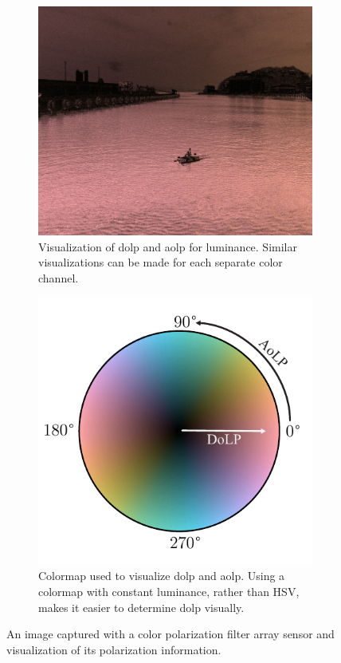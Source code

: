 \begin{figure}[H]\ContinuedFloat
    \begin{subfigure}[B]{.49\textwidth}
        \includegraphics[width=\textwidth]{figures/img_0080_right_pol.jpg}
        \caption{Visualization of \gls{dolp} and \gls{aolp} for luminance. Similar visualizations can be made for each separate color channel.}
    \end{subfigure}
    \hfill
    \begin{subfigure}[B]{.49\textwidth}
        \centering
        \includegraphics[width=.8\textwidth]{figures/cmap/aolp_dolp_cmap.pdf}
        \vspace{1em}
        \caption{Colormap used to visualize \gls{dolp} and \gls{aolp}. Using a colormap with constant luminance, rather than HSV, makes it easier to determine \gls{dolp} visually. }
    \end{subfigure}
    \caption{An image captured with a color polarization filter array sensor and visualization of its polarization information. \label{fig:cpfa_demosaicking}}
\end{figure}

